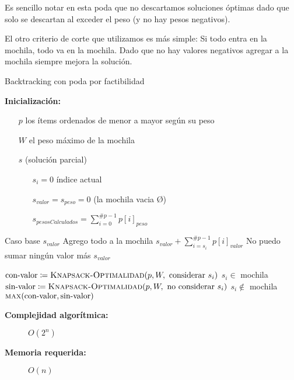 \documentclass[fleqn, 11pt]{article}
\def\is{\coloneqq}
\begin{document}
Es sencillo notar en esta poda que no descartamos soluciones óptimas dado que solo se descartan al exceder el peso (y no hay pesos negativos).

El otro criterio de corte que utilizamos es más simple: Si todo entra en la mochila, todo va en la mochila. Dado que no hay valores negativos agregar a la mochila siempre mejora la solución.

\clearpage

\begin{algorithm}
\caption{Backtracking con poda por factibilidad}
\begin{algorithmic}[1]
\item[\textbf{Inicialización:}]
\item[] \begin{itemize}
	\item[] $p$ los ítems ordenados de menor a mayor según su peso
	\item[] $W$ el peso máximo de la mochila
	\item[] $s$ (solución parcial)
	\begin{itemize}
		\item[] $s_i = 0$ índice actual
		\item[] $s_{valor} = s_{peso} = 0$ (la mochila vacia \O)
		\item[] $s_{pesosCalculados} = \sum_{i = 0}^{\#p - 1} p[i]_{peso}$
	\end{itemize}
\end{itemize}
\Statex
{}
	\Comment Caso base
	\State \Return $s_{valor}$
\EndIf
{}
	\Comment Agrego todo a la mochila
	\State \Return $s_{valor} + \sum_{i=s_i}^{\#p - 1} p[i]_{valor}$
\EndIf
{}
	\Comment No puedo sumar ningún valor más
	\State \Return $s_{valor}$
\EndIf

\State $\text{con-valor} \is \Call{Knapsack-Optimalidad}{p, W, \text{ considerar } s_i}$
\Comment $s_i \in$ mochila
\State $\text{sin-valor} \is \Call{Knapsack-Optimalidad}{p, W, \text{ no considerar } s_i}$
\Comment $s_i \not\in$ mochila
\State \Return $\Call{max}{\text{con-valor}, \text{sin-valor}}$
\EndFunction
\end{algorithmic}
\begin{description}
	\item[\textbf{Complejidad algorítmica:}] $O(2^n)$
	\item[\textbf{Memoria requerida:}] $O(n)$
\end{description}
\end{algorithm}
\end{document}
